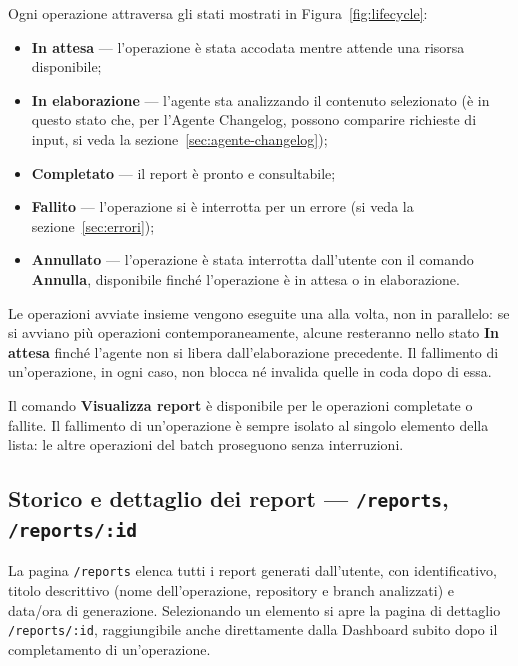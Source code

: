 \documentclass[11pt,a4paper]{article}
\newcommand{\route}[1]{\texttt{#1}}
\begin{document}
Ogni operazione attraversa gli stati mostrati in Figura~\ref{fig:lifecycle}:

\begin{itemize}
  \item \textbf{In attesa} --- l'operazione è stata accodata mentre attende una risorsa
        disponibile;
  \item \textbf{In elaborazione} --- l'agente sta analizzando il contenuto selezionato
        (è in questo stato che, per l'Agente Changelog, possono comparire richieste di
        input, si veda la sezione~\ref{sec:agente-changelog});
  \item \textbf{Completato} --- il report è pronto e consultabile;
  \item \textbf{Fallito} --- l'operazione si è interrotta per un errore (si veda la
        sezione~\ref{sec:errori});
  \item \textbf{Annullato} --- l'operazione è stata interrotta dall'utente con il comando
        \textbf{Annulla}, disponibile finché l'operazione è in attesa o in elaborazione.
\end{itemize}

\begin{nota}
Le operazioni avviate insieme vengono eseguite una alla volta, non in parallelo: se si
avviano più operazioni contemporaneamente, alcune resteranno nello stato \textbf{In
attesa} finché l'agente non si libera dall'elaborazione precedente. Il fallimento di
un'operazione, in ogni caso, non blocca né invalida quelle in coda dopo di essa.
\end{nota}

Il comando \textbf{Visualizza report} è disponibile per le operazioni completate o fallite.
Il fallimento di un'operazione è sempre isolato al singolo elemento della lista: le altre
operazioni del batch proseguono senza interruzioni.

\subsection{Storico e dettaglio dei report --- \texttt{/reports}, \texttt{/reports/:id}}

La pagina \route{/reports} elenca tutti i report generati dall'utente, con identificativo,
titolo descrittivo (nome dell'operazione, repository e branch analizzati) e data/ora di
generazione. Selezionando un elemento si apre la pagina di dettaglio \route{/reports/:id},
raggiungibile anche direttamente dalla Dashboard subito dopo il completamento di
un'operazione.
\end{document}
